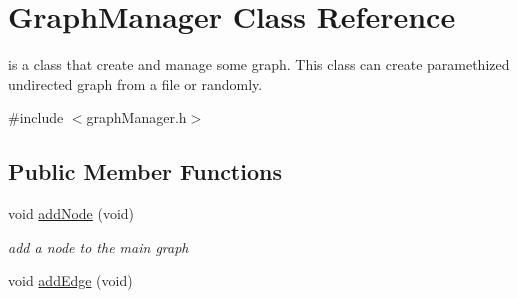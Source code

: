 \hypertarget{classGraphManager}{\section{Graph\-Manager Class Reference}
\label{classGraphManager}
}


is a class that create and manage some graph. This class can create paramethized undirected graph from a file or randomly.  




{\ttfamily \#include $<$graph\-Manager.\-h$>$}

\subsection*{Public Member Functions}
\begin{DoxyCompactItemize}
\item 
\hypertarget{classGraphManager_a3857f4b72cec739b65cebcb20e74ebdf}{void \hyperlink{classGraphManager_a3857f4b72cec739b65cebcb20e74ebdf}{add\-Node} (void)}\label{classGraphManager_a3857f4b72cec739b65cebcb20e74ebdf}

\begin{DoxyCompactList}\small\item\em add a node to the main graph \end{DoxyCompactList}\item 
\hypertarget{classGraphManager_af7e1254c8c40b94ce005cef87c5b649a}{void \hyperlink{classGraphManager_af7e1254c8c40b94ce005cef87c5b649a}{add\-Edge} (void)}\label{classGraphManager_af7e1254c8c40b94ce005cef87c5b649a}


\end{DoxyCompactItemize}
